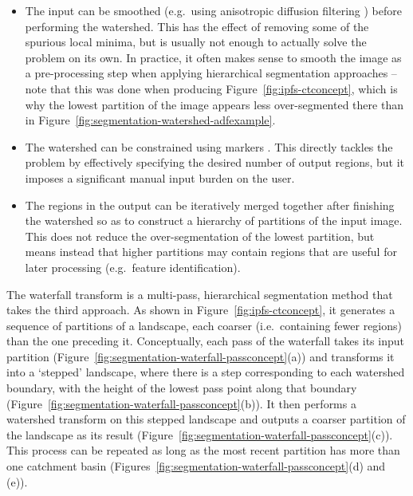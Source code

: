 \documentclass[review,a4paper]{elsarticle}
\begin{document}
\begin{itemize}

\item The input can be smoothed (e.g.~using anisotropic diffusion filtering \cite{perona90}) before performing the watershed. This has the effect of removing some of the spurious local minima, but is usually not enough to actually solve the problem on its own. In practice, it often makes sense to smooth the image as a pre-processing step when applying hierarchical segmentation approaches -- note that this was done when producing Figure~\ref{fig:ipfs-ctconcept}, which is why the lowest partition of the image appears less over-segmented there than in Figure~\ref{fig:segmentation-watershed-adfexample}.

\item The watershed can be constrained using markers \cite{meyer90}. This directly tackles the problem by effectively specifying the desired number of output regions, but it imposes a significant manual input burden on the user.

\item The regions in the output can be iteratively merged together after finishing the watershed so as to construct a hierarchy of partitions of the input image. This does not reduce the over-segmentation of the lowest partition, but means instead that higher partitions may contain regions that are useful for later processing (e.g.~feature identification).

\end{itemize}
%
The waterfall transform is a multi-pass, hierarchical segmentation method that takes the third approach. As shown in Figure~\ref{fig:ipfs-ctconcept}, it generates a sequence of partitions of a landscape, each coarser (i.e.~containing fewer regions) than the one preceding it. Conceptually, each pass of the waterfall takes its input partition (Figure~\ref{fig:segmentation-waterfall-passconcept}(a)) and transforms it into a `stepped' landscape, where there is a step corresponding to each watershed boundary, with the height of the lowest pass point along that boundary (Figure~\ref{fig:segmentation-waterfall-passconcept}(b)). It then performs a watershed transform on this stepped landscape and outputs a coarser partition of the landscape as its result (Figure~\ref{fig:segmentation-waterfall-passconcept}(c)). This process can be repeated as long as the most recent partition has more than one catchment basin (Figures~\ref{fig:segmentation-waterfall-passconcept}(d) and (e)).
\end{document}
